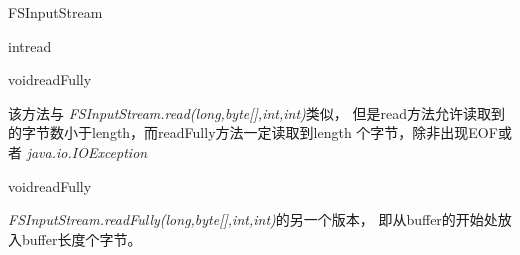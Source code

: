 \begin{XeClass}{FSInputStream}
\begin{XeMethod}{\XePublic}{int}{read}
    \end{XeMethod}

    \begin{XeMethod}{\XePublic}{void}{readFully}
         
 该方法与 \emph{FSInputStream.read(long,byte[],int,int)}类似，
 但是read方法允许读取到的字节数小于length，而readFully方法一定读取到length
 个字节，除非出现EOF或者 \emph{java.io.IOException}

    \end{XeMethod}

    \begin{XeMethod}{\XePublic}{void}{readFully}
         
 \emph{FSInputStream.readFully(long,byte[],int,int)}的另一个版本，
 即从buffer的开始处放入buffer长度个字节。

    \end{XeMethod}

\end{XeClass}
